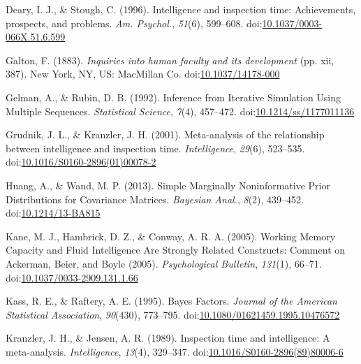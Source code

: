 \documentclass[
  ,man]{apa6}
\newlength{\cslhangindent}
\newenvironment{CSLReferences}[2] %
 {\begin{list}{}{%
  \setlength{\itemindent}{0pt}
  \setlength{\leftmargin}{0pt}
  \setlength{\parsep}{0pt}
  \ifodd #1
   \setlength{\leftmargin}{\cslhangindent}
   \setlength{\itemindent}{-1\cslhangindent}
  \fi
  \setlength{\itemsep}{#2\baselineskip}}}
 {\end{list}}
\begin{document}
\begin{CSLReferences}{1}{0}
Deary, I. J., \& Stough, C. (1996). Intelligence and inspection time: {Achievements}, prospects, and problems. \emph{Am. Psychol.}, \emph{51}(6), 599--608. doi:\href{https://doi.org/10.1037/0003-066X.51.6.599}{10.1037/0003-066X.51.6.599}

Galton, F. (1883). \emph{Inquiries into human faculty and its development} (pp. xii, 387). New York, NY, US: MacMillan Co. doi:\href{https://doi.org/10.1037/14178-000}{10.1037/14178-000}

Gelman, A., \& Rubin, D. B. (1992). Inference from {Iterative Simulation Using Multiple Sequences}. \emph{Statistical Science}, \emph{7}(4), 457--472. doi:\href{https://doi.org/10.1214/ss/1177011136}{10.1214/ss/1177011136}

Grudnik, J. L., \& Kranzler, J. H. (2001). Meta-analysis of the relationship between intelligence and inspection time. \emph{Intelligence}, \emph{29}(6), 523--535. doi:\href{https://doi.org/10.1016/S0160-2896(01)00078-2}{10.1016/S0160-2896(01)00078-2}

Huang, A., \& Wand, M. P. (2013). Simple {Marginally Noninformative Prior Distributions} for {Covariance Matrices}. \emph{Bayesian Anal.}, \emph{8}(2), 439--452. doi:\href{https://doi.org/10.1214/13-BA815}{10.1214/13-BA815}

Kane, M. J., Hambrick, D. Z., \& Conway, A. R. A. (2005). Working {Memory Capacity} and {Fluid Intelligence Are Strongly Related Constructs}: {Comment} on {Ackerman}, {Beier}, and {Boyle} (2005). \emph{Psychological Bulletin}, \emph{131}(1), 66--71. doi:\href{https://doi.org/10.1037/0033-2909.131.1.66}{10.1037/0033-2909.131.1.66}

Kass, R. E., \& Raftery, A. E. (1995). Bayes {Factors}. \emph{Journal of the American Statistical Association}, \emph{90}(430), 773--795. doi:\href{https://doi.org/10.1080/01621459.1995.10476572}{10.1080/01621459.1995.10476572}

Kranzler, J. H., \& Jensen, A. R. (1989). Inspection time and intelligence: {A} meta-analysis. \emph{Intelligence}, \emph{13}(4), 329--347. doi:\href{https://doi.org/10.1016/S0160-2896(89)80006-6}{10.1016/S0160-2896(89)80006-6}


\end{CSLReferences}
\end{document}
